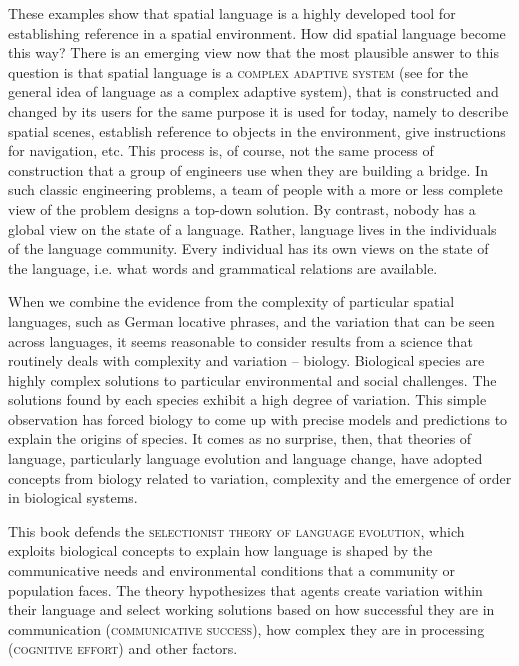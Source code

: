 These examples show that spatial language is a highly developed tool for 
establishing reference in a spatial environment. How did spatial language 
become this way? There is an emerging view now that the most plausible answer 
to this question is that spatial language is a \textsc{complex adaptive system}
(see \citealt{steels2000language} for the general idea of language as a complex adaptive system), 
that is constructed and changed by its users for the same purpose it is used for today, 
namely to describe spatial scenes,
establish reference to objects in the environment, give instructions for navigation, etc.
This process is, of course, not the same process of construction that a group
of engineers use when they are building a bridge. In such classic engineering
problems, a team of people with a more or less complete view of the problem
designs a top-down solution. By contrast, nobody has a global view on the state 
of a language. Rather, language lives in the individuals of 
the language community. Every individual has 
its own views on the state of the language, i.e. what words and 
grammatical relations are available.

When we combine the evidence from the complexity of particular spatial languages,
such as German locative phrases, and the variation that can be seen across 
languages, it seems reasonable to consider results from a science 
that routinely deals with complexity and variation -- biology. Biological species are highly 
complex solutions to particular environmental and social challenges. The solutions
found by each species exhibit a high degree of variation. This simple observation has
forced biology to come up with precise models and predictions to explain the 
origins of species. It comes as no surprise, then, that theories of language, particularly 
language evolution and language change, have adopted concepts 
from biology related to variation, complexity and the emergence of order 
in biological systems.  

This book defends the \textsc{selectionist theory of language evolution},
which exploits biological concepts to explain how language is shaped 
by the communicative needs and environmental conditions that a 
community or population faces. 
The theory hypothesizes that agents create variation within their language 
and select working solutions based on how successful they are 
in communication (\textsc{communicative success}), 
how complex they are in processing (\textsc{cognitive effort}) and 
other factors. 

